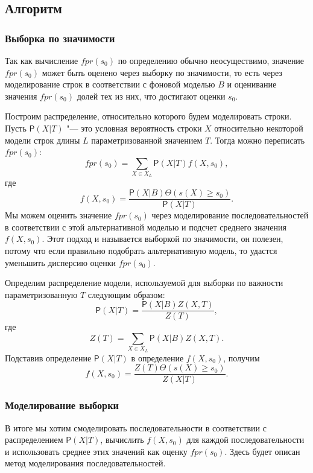 \documentclass[specialist,
substylefile = spbu_report.rtx,
subf,href,colorlinks=true, 12pt]{disser}
\begin{document}
		\subsection{Алгоритм}
			\subsubsection{Выборка по значимости}
				Так как вычисление $fpr(s_{0})$ по определению обычно неосуществимо, значение $fpr(s_{0})$ может быть оценено через выборку по значимости, то есть через моделирование строк в соответствии с фоновой моделью $B$ и оценивание значения $fpr(s_{0})$ долей тех из них, что достигают оценки $s_{0}$.
				
				Построим распределение, относительно которого будем моделировать строки. Пусть $\mathsf{P}(X|T)$ "--- это условная вероятность строки $X$ относительно некоторой модели строк длины $L$ параметризованной значением $T$. Тогда можно переписать $fpr(s_{0})$:
				\begin{equation*}
					fpr(s_{0}) = \sum_{X \in X_{L}} \mathsf{P}(X|T) f(X,s_{0}),
				\end{equation*}
				где
				\begin{equation*}
					f(X,s_{0}) = \frac{\mathsf{P}(X|B) \Theta(s(X) \geq s_{0})}{\mathsf{P}(X|T)}.
				\end{equation*}
				Мы можем оценить значение $fpr(s_{0})$ через моделирование последовательностей в соответствии с этой альтернативной моделью и подсчет среднего значения $f(X,s_{0})$. Этот подход и называется выборкой по значимости, он полезен, потому что если правильно подобрать альтернативную модель, то удастся уменьшить дисперсию оценки $fpr(s_{0})$.
					
				Определим распределение модели, используемой для выборки по важности параметризованную $T$ следующим образом:
				\begin{equation*}
					\mathsf{P}(X|T) = \frac{\mathsf{P}(X|B)Z(X,T)}{Z(T)},
				\end{equation*}							
				где 
				\begin{equation*}
					Z(T) = \sum_{X \in X_{L}}\mathsf{P}(X|B)Z(X,T).
				\end{equation*}	
				Подставив определение $\mathsf{P}(X|T)$ в определение $f(X,s_{0})$, получим 
				\begin{equation*}
					f(X,s_{0}) = \frac{Z(T)\Theta(s(X) \geq s_{0})}{Z(X|T)}.
				\end{equation*}		
		
			\subsubsection{Моделирование выборки}
				В итоге мы хотим смоделировать последовательности в соответствии с распределением $\mathsf{P}(X|T)$, вычислить $f(X, s_{0})$ для каждой последовательности и использовать среднее этих значений как оценку $fpr(s_{0})$. Здесь будет описан метод моделирования последовательностей.
				
\end{document}
